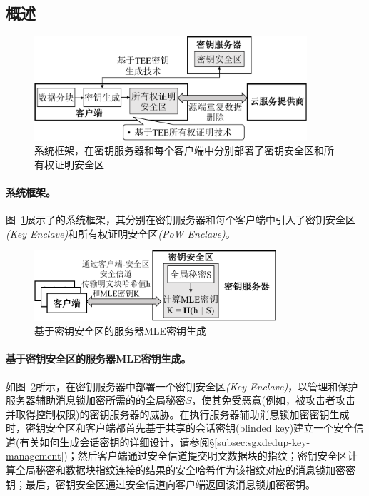 \subsection{概述}
\label{subsec:sgxdedup-arch}

\begin{figure}[!htb]
    \centering
    \includegraphics[width=0.9\textwidth]{pic/sgxdedup/sgxdedup-arch.pdf}
    \caption{\sysnameS 系统框架，在密钥服务器和每个客户端中分别部署了密钥安全区和所有权证明安全区}
    \label{fig:sgxdedup-overview}
\end{figure}

\paragraph*{\sysnameS 系统框架。}图~\ref{fig:sgxdedup-overview}展示了\sysnameS 的系统框架，其分别在密钥服务器和每个客户端中引入了密钥安全区\textit{(Key Enclave)}和所有权证明安全区\textit{(PoW Enclave)}。 

\begin{figure}[!htb]
    \centering
    \includegraphics[width=0.8\textwidth]{pic/sgxdedup/key-enclave.pdf}
    \caption{基于密钥安全区的服务器MLE密钥生成}
    \label{fig:sgxdedup-overview-key}
\end{figure}

\paragraph*{基于密钥安全区的服务器MLE密钥生成。}如图~\ref{fig:sgxdedup-overview-key}所示，\sysnameS 在密钥服务器中部署一个密钥安全区\textit{(Key Enclave)}，以管理和保护服务器辅助消息锁加密所需的的全局秘密$S$，使其免受恶意(例如，被攻击者攻击并取得控制权限)的密钥服务器的威胁。在执行服务器辅助消息锁加密密钥生成时，密钥安全区和客户端都首先基于共享的会话密钥(blinded key)建立一个安全信道(有关如何生成会话密钥的详细设计，请参阅\S\ref{subsec:sgxdedup-key-management})；然后客户端通过安全信道提交明文数据块的指纹；密钥安全区计算全局秘密和数据块指纹连接的结果的安全哈希作为该指纹对应的消息锁加密密钥；最后，密钥安全区通过安全信道向客户端返回该消息锁加密密钥。

